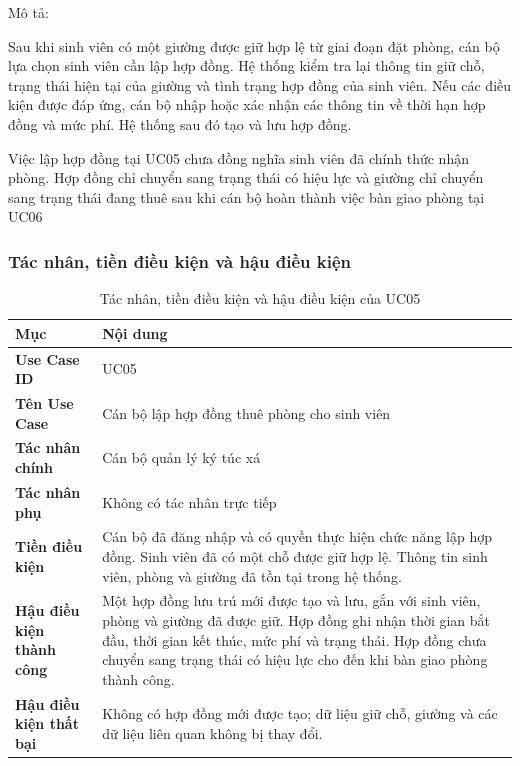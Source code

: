 Mô tả:

Sau khi sinh viên có một giường được giữ hợp lệ từ giai đoạn đặt phòng, cán bộ lựa chọn sinh viên cần lập hợp đồng. Hệ thống kiểm tra lại thông tin giữ chỗ, trạng thái hiện tại của giường và tình trạng hợp đồng của sinh viên. Nếu các điều kiện được đáp ứng, cán bộ nhập hoặc xác nhận các thông tin về thời hạn hợp đồng và mức phí. Hệ thống sau đó tạo và lưu hợp đồng.

Việc lập hợp đồng tại UC05 chưa đồng nghĩa sinh viên đã chính thức nhận phòng. Hợp đồng chỉ chuyển sang trạng thái có hiệu lực và giường chỉ chuyển sang trạng thái đang thuê sau khi cán bộ hoàn thành việc bàn giao phòng tại UC06

\subsubsection{Tác nhân, tiền điều kiện và hậu điều kiện}

\begin{table}[H]
\centering
\small
\caption{Tác nhân, tiền điều kiện và hậu điều kiện của UC05}
\label{tab:ch2-9}
\begin{tabularx}{\textwidth}{|>{\raggedright\arraybackslash}p{}|>{\raggedright\arraybackslash}X|}
\hline
\textbf{Mục} & \textbf{Nội dung} \\
\hline
\textbf{Use Case ID} & UC05 \\
\hline
\textbf{Tên Use Case} & Cán bộ lập hợp đồng thuê phòng cho sinh viên \\
\hline
\textbf{Tác nhân chính} & Cán bộ quản lý ký túc xá \\
\hline
\textbf{Tác nhân phụ} & Không có tác nhân trực tiếp \\
\hline
\textbf{Tiền điều kiện} & Cán bộ đã đăng nhập và có quyền thực hiện chức năng lập hợp đồng. Sinh viên đã có một chỗ được giữ hợp lệ. Thông tin sinh viên, phòng và giường đã tồn tại trong hệ thống. \\
\hline
\textbf{Hậu điều kiện thành công} & Một hợp đồng lưu trú mới được tạo và lưu, gắn với sinh viên, phòng và giường đã được giữ. Hợp đồng ghi nhận thời gian bắt đầu, thời gian kết thúc, mức phí và trạng thái. Hợp đồng chưa chuyển sang trạng thái có hiệu lực cho đến khi bàn giao phòng thành công. \\
\hline
\textbf{Hậu điều kiện thất bại} & Không có hợp đồng mới được tạo; dữ liệu giữ chỗ, giường và các dữ liệu liên quan không bị thay đổi. \\
\hline
\end{tabularx}
\end{table}

